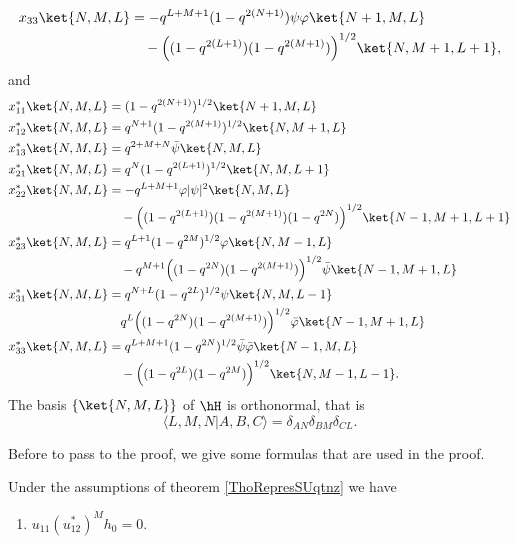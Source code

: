 \begin{theorem}
\begin{subequations}
\begin{align}
            x_{33}\ket{N,M,L}&=-q^{L+M+1}(1-q^{2(N+1)})\psi\varphi\ket{N+1,M,L}\\&\quad-\Big( (1-q^{2(L+1)})(1-q^{2(M+1)}) \Big)^{1/2}\ket{N,M+1,L+1},
        \end{align}
    \end{subequations}
    and
    \begin{subequations}
        \begin{align}
            x_{11}^*\ket{N,M,L}&=(1-q^{2(N+1)})^{1/2}\ket{N+1,M,L}\\
            x_{12}^*\ket{N,M,L}&=q^{N+1}(1-q^{2(M+1)})^{1/2}\ket{N,M+1,L}\\
            x_{13}^*\ket{N,M,L}&=q^{2+M+N}\bar\psi\ket{N,M,L}\\
            x_{21}^*\ket{N,M,L}&=q^N(1-q^{2(L+1)})^{1/2}\ket{N,M,L+1}\\
            x_{22}^*\ket{N,M,L}&=-q^{L+M+1}\varphi| \psi |^2\ket{N,M,L}\\&\quad -\Big( (1-q^{2(L+1)})(1-q^{2(M+1)})(1-q^{2N}) \Big)^{1/2}\ket{N-1,M+1,L+1}\\
            x_{23}^*\ket{N,M,L}&=q^{L+1}(1-q^{2M})^{1/2}\varphi\ket{N,M-1,L}\\&\quad -q^{M+1}\Big( (1-q^{2N})(1-q^{2(M+1)}) \Big)^{1/2}\bar\psi\ket{N-1,M+1,L}\\
            x_{31}^*\ket{N,M,L}&=q^{N+L}(1-q^{2L})^{1/2}\psi\ket{N,M,L-1}\\&\quad q^L\Big( (1-q^{2N})(1-q^{2(M+1)}) \Big)^{1/2}\bar\varphi\ket{N-1,M+1,L}\\
            x_{33}^*\ket{N,M,L}&=q^{L+M+1}(1-q^{2N})^{1/2}\bar\psi\bar\varphi\ket{N-1,M,L}\\&\quad -\Big( (1-q^{2L})(1-q^{2M}) \Big)^{1/2}\ket{N,M-1,L-1}.
        \end{align}
    \end{subequations}
    The basis \(\{ \ket{N,M,L} \}\) of \( \hH\) is orthonormal, that is
    \begin{equation}
        \langle L,M,N|A,B,C\rangle = \delta_{AN}\delta_{BM}\delta_{CL}.
    \end{equation}
\end{theorem}

Before to pass to the proof, we give some formulas that are used in the proof.
\begin{lemma}       \label{LemTechrepresSUqtnez}
    Under the assumptions of theorem \ref{ThoRepresSUqtnz} we have
    \begin{enumerate}
        \item   \label{ItemLemTechrepresSUqtnez}
            \( u_{11}(u_{12}^*)^Mh_0=0\).
    \end{enumerate}
\end{lemma}

